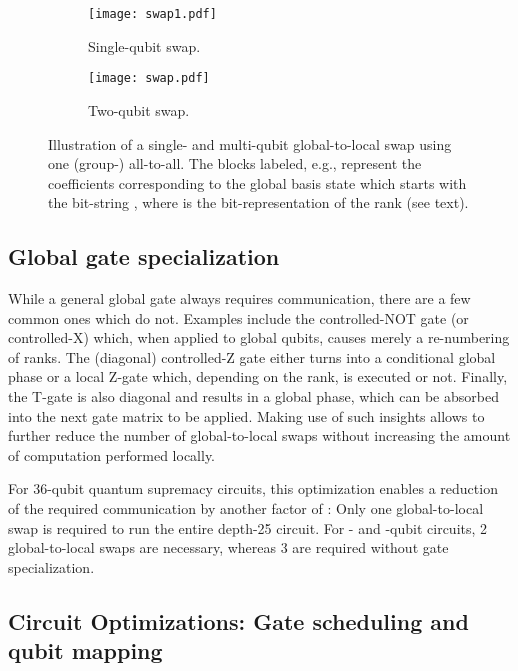 \documentclass[sigconf]{acmart}
\begin{document}
\begin{figure}[t]
\begin{center}
\begin{subfigure}{\linewidth}
\centering
\texttt{[image: swap1.pdf]}
\vspace{10pt}
\caption{Single-qubit swap.}
\label{fig:swap1}
\end{subfigure}

\vspace{10pt}

\begin{subfigure}{\linewidth}
\centering
\texttt{[image: swap.pdf]}
\vspace{5pt}
\caption{Two-qubit swap.}
\label{fig:swap}
\end{subfigure}
\end{center}
\caption{Illustration of a single- and multi-qubit global-to-local swap using one (group-) all-to-all. The blocks labeled, e.g.,  represent the coefficients corresponding to the global basis state which starts with the bit-string , where  is the bit-representation of the rank (see text).}
\end{figure}

\subsection{Global gate specialization}
While a general global gate always requires communication, there are a few common ones which do not. Examples include the controlled-NOT gate (or controlled-X) which, when applied to global qubits, causes merely a re-numbering of ranks. The (diagonal) controlled-Z gate either turns into a conditional global phase or a local Z-gate which, depending on the rank, is executed or not. Finally, the T-gate is also diagonal and results in a global phase, which can be absorbed into the next gate matrix to be applied. Making use of such insights allows to further reduce the number of global-to-local swaps without increasing the amount of computation performed locally.

For 36-qubit quantum supremacy circuits, this optimization enables a reduction of the required communication by another factor of : Only one global-to-local swap is required to run the entire depth-25 circuit. For - and -qubit circuits, 2 global-to-local swaps are necessary, whereas 3 are required without gate specialization.

\subsection{Circuit Optimizations: Gate scheduling and qubit mapping}\label{sec:scheduling}
\end{document}
